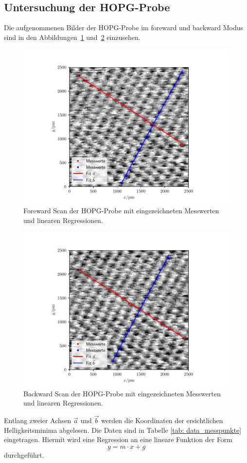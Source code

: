 \subsection{Untersuchung der HOPG-Probe}
Die aufgenommenen Bilder der HOPG-Probe im foreward und backward Modus sind in den Abbildungen~\ref{fig: foreward}
und~\ref{fig: backward} einzusehen.
\begin{figure}
  \centering
  \includegraphics[width = \textwidth]{../Messdaten/bilder/fit_01_foreward.pdf}
  \caption{Foreward Scan der HOPG-Probe mit eingezeichneten Messwerten und linearen Regressionen.}
  \label{fig: foreward}
\end{figure}
\begin{figure}
  \centering
  \includegraphics[width = \textwidth]{../Messdaten/bilder/fit_01_backward.pdf}
  \caption{Backward Scan der HOPG-Probe mit eingezeichneten Messwerten und linearen Regressionen.}
  \label{fig: backward}
\end{figure}
Entlang zweier Achsen $\vec{a}$ und $\vec{b}$ werden die Koordinaten der ersichtlichen Helligkeitsminima
abgelesen. Die Daten sind in Tabelle \ref{tab: data_messpunkte} eingetragen. Hiermit wird eine Regression an eine
lineare Funktion der Form
\begin{equation}
  y = m \cdot x + g
\end{equation}
durchgeführt.


